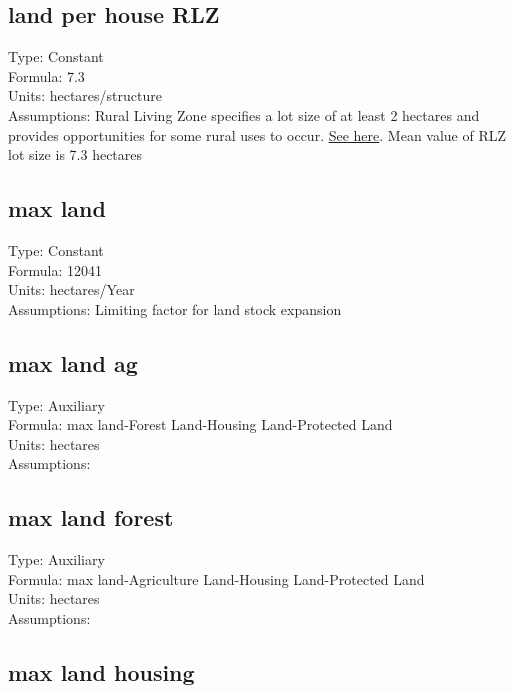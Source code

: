 \documentclass[
  11pt,
]{book}
\begin{document}
\hypertarget{land-per-house-rlz}{%
\subsection{land per house RLZ}\label{land-per-house-rlz}}

Type: Constant\\
Formula: 7.3\\
Units: hectares/structure\\
Assumptions: Rural Living Zone specifies a lot size of at least 2 hectares and provides opportunities for some rural uses to occur. \href{https://www.planning.vic.gov.au/__data/assets/pdf_file/0026/97172/PPN37-Rural-Residential-Development_June-2015.pdf}{See here}. Mean value of RLZ lot size is 7.3 hectares

\hypertarget{max-land}{%
\subsection{max land}\label{max-land}}

Type: Constant\\
Formula: 12041\\
Units: hectares/Year\\
Assumptions: Limiting factor for land stock expansion

\hypertarget{max-land-ag}{%
\subsection{max land ag}\label{max-land-ag}}

Type: Auxiliary\\
Formula: max land-Forest Land-Housing Land-Protected Land\\
Units: hectares\\
Assumptions:

\hypertarget{max-land-forest}{%
\subsection{max land forest}\label{max-land-forest}}

Type: Auxiliary\\
Formula: max land-Agriculture Land-Housing Land-Protected Land\\
Units: hectares\\
Assumptions:

\hypertarget{max-land-housing}{%
\subsection{max land housing}\label{max-land-housing}}
\end{document}
